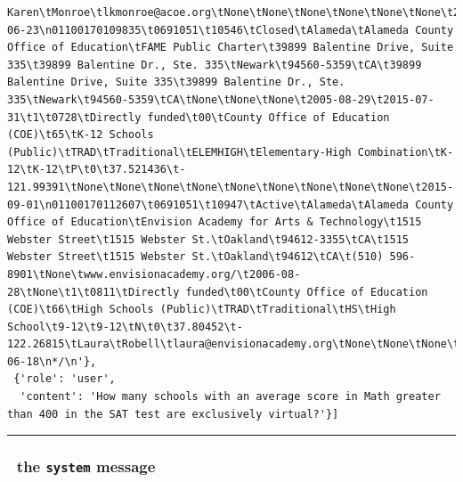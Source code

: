 \documentclass[
  letterpaper,
  DIV=11,
  numbers=noendperiod]{scrartcl}
\begin{document}
\begin{verbatim}
Karen\tMonroe\tlkmonroe@acoe.org\tNone\tNone\tNone\tNone\tNone\tNone\t2015-06-23\n01100170109835\t0691051\t10546\tClosed\tAlameda\tAlameda County Office of Education\tFAME Public Charter\t39899 Balentine Drive, Suite 335\t39899 Balentine Dr., Ste. 335\tNewark\t94560-5359\tCA\t39899 Balentine Drive, Suite 335\t39899 Balentine Dr., Ste. 335\tNewark\t94560-5359\tCA\tNone\tNone\tNone\t2005-08-29\t2015-07-31\t1\t0728\tDirectly funded\t00\tCounty Office of Education (COE)\t65\tK-12 Schools (Public)\tTRAD\tTraditional\tELEMHIGH\tElementary-High Combination\tK-12\tK-12\tP\t0\t37.521436\t-121.99391\tNone\tNone\tNone\tNone\tNone\tNone\tNone\tNone\tNone\t2015-09-01\n01100170112607\t0691051\t10947\tActive\tAlameda\tAlameda County Office of Education\tEnvision Academy for Arts & Technology\t1515 Webster Street\t1515 Webster St.\tOakland\t94612-3355\tCA\t1515 Webster Street\t1515 Webster St.\tOakland\t94612\tCA\t(510) 596-8901\tNone\twww.envisionacademy.org/\t2006-08-28\tNone\t1\t0811\tDirectly funded\t00\tCounty Office of Education (COE)\t66\tHigh Schools (Public)\tTRAD\tTraditional\tHS\tHigh School\t9-12\t9-12\tN\t0\t37.80452\t-122.26815\tLaura\tRobell\tlaura@envisionacademy.org\tNone\tNone\tNone\tNone\tNone\tNone\t2015-06-18\n*/\n'},
 {'role': 'user',
  'content': 'How many schools with an average score in Math greater than 400 in the SAT test are exclusively virtual?'}]
\end{verbatim}

\begin{center}\rule{0.5\linewidth}{0.5pt}\end{center}

\subsubsection{\texorpdfstring{🔎 the \texttt{system}
message}{🔎 the system message}}\label{the-system-message}
\end{document}

